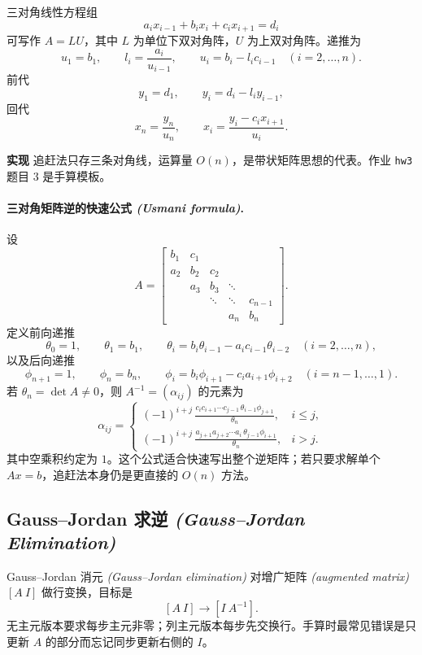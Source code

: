 \documentclass{article}
\newcommand{\impl}{\textcolor{blue!65!black}{\textbf{实现}}}
\newcommand{\eng}[1]{\texorpdfstring{{\normalfont\rmfamily\itshape\textcolor{blue!65!black}{(#1)}}}{(#1)}}
\begin{document}
三对角线性方程组
\[
  a_i x_{i-1}+b_i x_i+c_i x_{i+1}=d_i
\]
可写作 $A=LU$，其中 $L$ 为单位下双对角阵，$U$ 为上双对角阵。递推为
\[
  u_1=b_1,\qquad
  l_i=\frac{a_i}{u_{i-1}},\qquad
  u_i=b_i-l_ic_{i-1}\quad (i=2,\dots,n).
\]
前代
\[
  y_1=d_1,\qquad y_i=d_i-l_iy_{i-1},
\]
回代
\[
  x_n=\frac{y_n}{u_n},\qquad
  x_i=\frac{y_i-c_ix_{i+1}}{u_i}.
\]

\impl{} 追赶法只存三条对角线，运算量 $O(n)$，是带状矩阵思想的代表。作业 \texttt{hw3}
题目 3 是手算模板。

\paragraph{三对角矩阵逆的快速公式 \eng{Usmani formula}.}
设
\[
  A=
  \begin{bmatrix}
    b_1&c_1\\
    a_2&b_2&c_2\\
    &a_3&b_3&\ddots\\
    &&\ddots&\ddots&c_{n-1}\\
    &&&a_n&b_n
  \end{bmatrix}.
\]
定义前向递推
\[
  \theta_0=1,\qquad \theta_1=b_1,\qquad
  \theta_i=b_i\theta_{i-1}-a_i c_{i-1}\theta_{i-2}\quad (i=2,\dots,n),
\]
以及后向递推
\[
  \phi_{n+1}=1,\qquad \phi_n=b_n,\qquad
  \phi_i=b_i\phi_{i+1}-c_i a_{i+1}\phi_{i+2}\quad (i=n-1,\dots,1).
\]
若 $\theta_n=\det A\ne0$，则 $A^{-1}=(\alpha_{ij})$ 的元素为
\[
  \alpha_{ij}=
  \begin{cases}
    \displaystyle
    (-1)^{i+j}\,
    \frac{c_i c_{i+1}\cdots c_{j-1}\,\theta_{i-1}\phi_{j+1}}{\theta_n},
    & i\le j,\\[10pt]
    \displaystyle
    (-1)^{i+j}\,
    \frac{a_{j+1}a_{j+2}\cdots a_i\,\theta_{j-1}\phi_{i+1}}{\theta_n},
    & i>j.
  \end{cases}
\]
其中空乘积约定为 $1$。这个公式适合快速写出整个逆矩阵；若只要求解单个
$Ax=b$，追赶法本身仍是更直接的 $O(n)$ 方法。

\subsection{Gauss--Jordan 求逆 \eng{Gauss--Jordan Elimination}}

Gauss--Jordan 消元 \eng{Gauss--Jordan elimination} 对增广矩阵
\eng{augmented matrix} $[A\ I]$ 做行变换，目标是
\[
  [A\ I]\longrightarrow [I\ A^{-1}].
\]
无主元版本要求每步主元非零；列主元版本每步先交换行。手算时最常见错误是只更新 $A$ 的部分而忘记同步更新右侧的 $I$。
\end{document}
